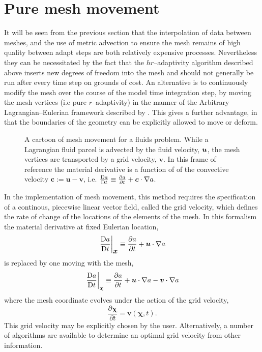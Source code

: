 \section{Pure mesh movement}

It will be seen from the previous section that the interpolation of data between meshes, and the use of metric advection to ensure the mesh remains of high quality between adapt steps are both relatively expensive processes. Nevertheless they can be necessitated by the fact that the $hr$--adaptivity algorithm described above inserts new degrees of freedom into the mesh and should not generally be run after every time step on grounds of cost. An alternative is to continuously modify the mesh over the course of the model time integration step, by moving the mesh vertices (i.e pure $r$--adaptivity) in the manner of the Arbitrary Lagrangian--Eulerian framework described by \cite{doneahuerta2004}. This gives a further advantage, in that the boundaries of the geometry can be explicitly allowed to move or deform.

\begin{figure}[h] 
\centering

\caption[Example of a moving mesh.]{A cartoon of mesh movement for a fluids problem. While a Lagrangian fluid parcel is advected by the fluid velocity, ${\mbox{\boldmath$u$}}$, the mesh vertices are transported by a grid velocity, $\bm{v}$. In this frame of reference the material derivative is a function of of the convective velocity $\bm{c}:=\bm{u}-\bm{v}$, i.e. $\frac{\mathrm{D} a}{\mathrm{D} t}\equiv\frac{\partial a}{\partial{t}}+\bm{c}\cdot\nabla a$.}
\label{fig:mesh_movement}
\end{figure}

In the \fluidity implementation of mesh movement, this method requires the specification of a continous, piecewise linear vector field, called the grid velocity, which defines the rate of change of the locations of the elements of the mesh. In this formalism the material derivative at fixed Eulerian location, 
\begin{equation}\left.\frac{\mathrm{D} a}{\mathrm{D} t}\right|_{{\mbox{\boldmath$x$}}}\equiv\frac{\partial{a}}{\partial{t}}+{\mbox{\boldmath$u$}}\cdot\nabla a
\end{equation} is replaced by one moving with the mesh, 
\begin{equation}
\left.\frac{\mathrm{D} a}{\mathrm{D} t}\right|_{\bm{\chi}}\equiv\frac{\partial{a}}{\partial{t}}+{\mbox{\boldmath$u$}}\cdot\nabla a-\bm{v}\cdot\nabla a
\end{equation}
where the mesh coordinate evolves under the action of the grid velocity,
\begin{equation}
\frac{\partial \bm{\chi}}{\partial t} = \bm{v}(\bm{\chi},t).
\end{equation}
 This grid velocity may be explicitly chosen by the user. Alternatively, a number of algorithms are available to determine an optimal grid velocity from other information.

